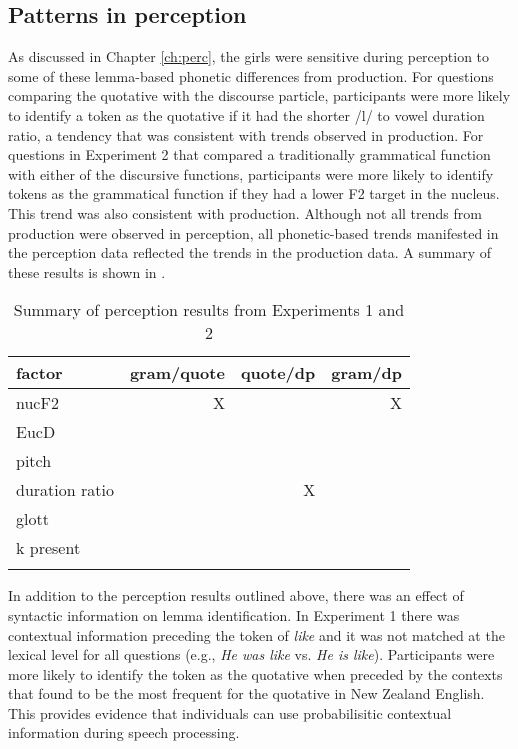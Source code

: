 \subsection{Patterns in perception}
As discussed in Chapter \ref{ch:perc}, the girls were sensitive during perception to some of these lemma-based phonetic differences from production.  For questions compa\-ring the quotative with the discourse particle, participants were more likely to identify a token as the quotative if it had the shorter /l/ to vowel duration ratio, a tendency that was consistent with trends observed in production.  For questions in Experiment 2 that compared a traditionally grammatical function with either of the discursive functions, participants were more likely to identify tokens as the grammatical function if they had a lower F2 target in the nucleus.  This trend was also consistent with production.  Although not all trends from production were observed in perception, all phonetic-based trends manifested in the perception data reflected the trends in the production data.  A summary of these results is shown in .   




\begin{table}[ht]
\begin{center}
\begin{tabular}{lrrr}
  \lsptoprule
 factor & gram/quote & quote/dp & gram/dp  \\
 \midrule
  nucF2        &   X  & &  X  \\
 EucD   			&     &   	&   \\
 pitch        &     &     &  \\
  duration ratio &    &  X  & \\
 glott        &      &    &  \\
 k present  &    &  &  \\

  \lspbottomrule

\end{tabular}
\caption{Summary of perception results from Experiments 1 and 2}
\label{tab:sumpercresults}
\end{center}
\end{table}

In addition to the perception results outlined above, there was an effect of syntactic information on lemma identification.  In Experiment 1 there was contextual information preceding the token of \textit{like} and it was not matched at the lexical level for all questions (e.g., \textit{He was like} vs. \textit{He is like}).  Participants were more likely to identify the token as the quotative when preceded by the contexts that \citet{buchstallerdarcy2009} found to be the most frequent for the quotative in New Zealand English.  This provides evidence that individuals can use probabilisitic contextual information during speech processing.

